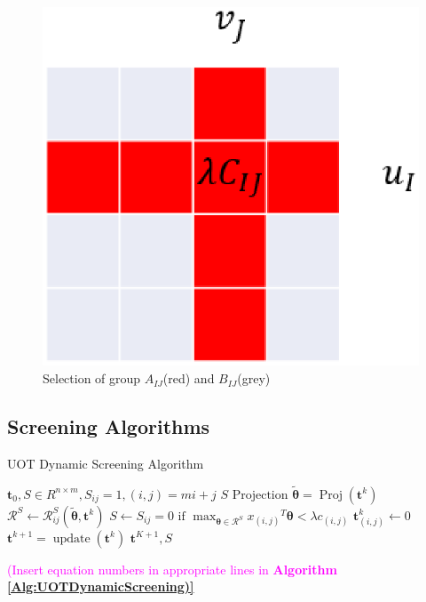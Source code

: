 \documentclass[twoside]{article}
\theoremstyle{plain}
\newcommand{\tranT}{T}
\renewcommand{\vec}[1]{\bm{#1}}
\newcommand{\note}[1]{\textcolor{magenta}{#1}}
\begin{document}
	\begin{figure}[h]
	\begin{center}	
	\includegraphics[width = 0.7\linewidth]{pic/divide}
	\caption{Selection of group $A_{IJ}$(red) and $B_{IJ}$(grey)}
	\end{center}	
	\end{figure}

\subsection{Screening Algorithms}

 \begin{algorithm}
 \caption{UOT Dynamic Screening Algorithm}
 \begin{algorithmic}[h]
 \label{Alg:UOTDynamicScreening}
 \renewcommand{\algorithmicrequire}{\textbf{Input:}}
 \renewcommand{\algorithmicensure}{\textbf{Output:}}
 \REQUIRE $\vec{t}_0, S \in R^{n\times m}, S_{ij}=1, (i,j) = mi+j$
 \ENSURE $S$
 \STATE {}
 \STATE $\text{Projection } \tilde{\vec{\theta}} = \operatorname{Proj}(\vec{t}^k)$ 
  \STATE $\mathcal{R}^{S} \leftarrow \mathcal{R}_{ij}^S{(\tilde{\vec{\theta}},\vec{t}^k)}$
   \STATE $S \leftarrow {S_{ij} = 0 \text{ if } \max_{\vec{\theta} \in \mathcal{R}^S} {x_{(i,j)}}^{\tranT}\vec{\theta} <\lambda c_{(i,j)} }$
 \ENDFOR
  \ENDFOR
  \STATE $\vec{t}^k_{(i,j)} \leftarrow 0$
  \ENDFOR
  \STATE $\vec{t}^{k+1} = \operatorname{update}(\vec{t}^k)$
 \ENDFOR
   \RETURN $\vec{t}^{K+1}, S $ 
 \end{algorithmic} 
 \end{algorithm}
 \note{(Insert equation numbers in appropriate lines in {\bf Algorithm \ref{Alg:UOTDynamicScreening)}}}
\end{document}
